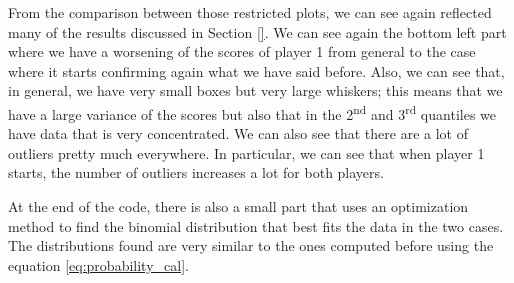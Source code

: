 From the comparison between those restricted plots, we can see again reflected many of the results discussed in Section \ref{}.
We can see again the bottom left part where we have a worsening of the scores of player 1 from general to the case where it starts confirming again what we have said before. 
Also, we can see that, in general, we have very small boxes but very large whiskers; this means that we have a large variance of the scores but also that in the 2\textsuperscript{nd} and 3\textsuperscript{rd} quantiles we have data that is very concentrated. We can also see that there are a lot of outliers pretty much everywhere. In particular, we can see that when player 1 starts, the number of outliers increases a lot for both players.

At the end of the code, there is also a small part that uses an optimization method to find the binomial distribution that best fits the data in the two cases. The distributions found are very similar to the ones computed before using the equation \ref{eq:probability_cal}.